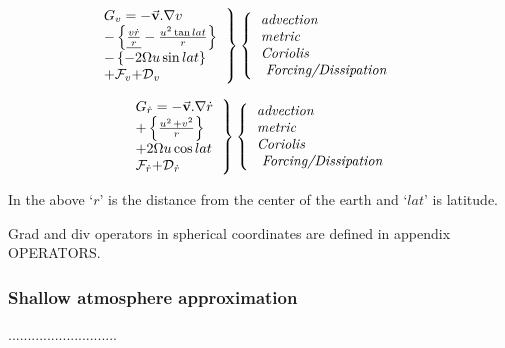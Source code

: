 \begin{equation}
\left. 
\begin{tabular}{l}
$G_{v}=-\vec{\mathbf{v}}.\nabla v$ \\ 
$-\left\{ \underline{\frac{v\dot{r}}{{r}}}-\frac{u^{2}\tan lat}{{r}
}\right\} $ \\ 
$-\left\{ -2\Omega u\sin lat\right\} $ \\ 
$+\mathcal{F}_{v}\mathcal{+D}_{v}$
\end{tabular}
\right\} \left\{ 
\begin{tabular}{l}
\textit{advection} \\ 
\textit{metric} \\ 
\textit{Coriolis} \\ 
\textit{\ Forcing/Dissipation}
\end{tabular}
\right. \qquad  \label{eq:gv-spherical}
\end{equation}
\qquad \qquad \qquad \qquad \qquad

\begin{equation}
\left. 
\begin{tabular}{l}
$G_{\dot{r}}=-\vec{\mathbf{v}}.\nabla \dot{r}$ \\ 
$+\left\{ \frac{u^{_{^{2}}}+v^{2}}{{{r}}}
\right\} $ \\ 
${+2\Omega u\cos lat}$ \\ 
$\mathcal{F}_{\dot{r}}\mathcal{+D}_{\dot{r}}$
\end{tabular}
\right\} \left\{ 
\begin{tabular}{l}
\textit{advection} \\ 
\textit{metric} \\ 
\textit{Coriolis} \\ 
\textit{\ Forcing/Dissipation}
\end{tabular}
\right.  \label{eq:gw-spherical}
\end{equation}
\qquad \qquad \qquad \qquad \qquad

In the above `${r}$' is the distance from the center of the earth and `$
lat$' is latitude.

Grad and div operators in spherical coordinates are defined in appendix
OPERATORS.

\subsubsection{Shallow atmosphere approximation}

............................

